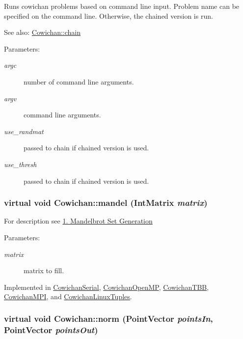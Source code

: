 Runs cowichan problems based on command line input. Problem name can be specified on the command line. Otherwise, the chained version is run. \begin{Desc}
\item[See also:]\hyperlink{class_cowichan_08ee88eb612571e8faa20b2645dc906d}{Cowichan::chain} \end{Desc}
\begin{Desc}
\item[Parameters:]
\begin{description}
\item[{\em argc}]number of command line arguments. \item[{\em argv}]command line arguments. \item[{\em use\_\-randmat}]passed to chain if chained version is used. \item[{\em use\_\-thresh}]passed to chain if chained version is used. \end{description}
\end{Desc}
\hypertarget{class_cowichan_ec6cc4eb2ad444474b923532167e98a2}{
\subsubsection[{mandel}]{\setlength{\rightskip}{0pt plus 5cm}virtual void Cowichan::mandel ({\bf IntMatrix} {\em matrix})}}
\label{class_cowichan_ec6cc4eb2ad444474b923532167e98a2}


For description see \hyperlink{index_mandel_sec}{1. Mandelbrot Set Generation} \begin{Desc}
\item[Parameters:]
\begin{description}
\item[{\em matrix}]matrix to fill. \end{description}
\end{Desc}


Implemented in \hyperlink{class_cowichan_serial_97a58b7901d8a7680cc28d42cb94d532}{CowichanSerial}, \hyperlink{class_cowichan_open_m_p_6809c2738792de047ee59259636c1afd}{CowichanOpenMP}, \hyperlink{class_cowichan_t_b_b_1e58b60ff22a58aba69567ecc6740878}{CowichanTBB}, \hyperlink{class_cowichan_m_p_i_58274fc55ed8a352a8924b130f3b5d2e}{CowichanMPI}, and \hyperlink{class_cowichan_linux_tuples_8774404842868381379ec627e8373cec}{CowichanLinuxTuples}.\hypertarget{class_cowichan_3df21e3c627958114e045c3559a29f30}{
\subsubsection[{norm}]{\setlength{\rightskip}{0pt plus 5cm}virtual void Cowichan::norm ({\bf PointVector} {\em pointsIn}, \/  {\bf PointVector} {\em pointsOut})}}
\label{class_cowichan_3df21e3c627958114e045c3559a29f30}


